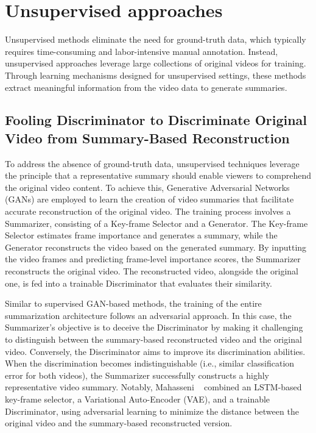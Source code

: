 \section{Unsupervised approaches} 
\label{section:rel-unsupervised} 

Unsupervised methods eliminate the need for ground-truth data, which typically requires time-consuming and labor-intensive manual annotation. Instead, unsupervised approaches leverage large collections of original videos for training. Through learning mechanisms designed for unsupervised settings, these methods extract meaningful information from the video data to generate summaries.

\subsection{Fooling Discriminator to Discriminate Original Video from Summary-Based Reconstruction}
\label{section:rel-unsup-discriminative}

To address the absence of ground-truth data, unsupervised techniques leverage the principle that a representative summary should enable viewers to comprehend the original video content. To achieve this, Generative Adversarial Networks (GANs) are employed to learn the creation of video summaries that facilitate accurate reconstruction of the original video. The training process involves a Summarizer, consisting of a Key-frame Selector and a Generator. The Key-frame Selector estimates frame importance and generates a summary, while the Generator reconstructs the video based on the generated summary. By inputting the video frames and predicting frame-level importance scores, the Summarizer reconstructs the original video. The reconstructed video, alongside the original one, is fed into a trainable Discriminator that evaluates their similarity.

Similar to supervised GAN-based methods, the training of the entire summarization architecture follows an adversarial approach. In this case, the Summarizer's objective is to deceive the Discriminator by making it challenging to distinguish between the summary-based reconstructed video and the original video. Conversely, the Discriminator aims to improve its discrimination abilities. When the discrimination becomes indistinguishable (i.e., similar classification error for both videos), the Summarizer successfully constructs a highly representative video summary. Notably, Mahasseni \etal~\cite{mahasseni2017unsupervised} combined an LSTM-based key-frame selector, a Variational Auto-Encoder (VAE), and a trainable Discriminator, using adversarial learning to minimize the distance between the original video and the summary-based reconstructed version.

